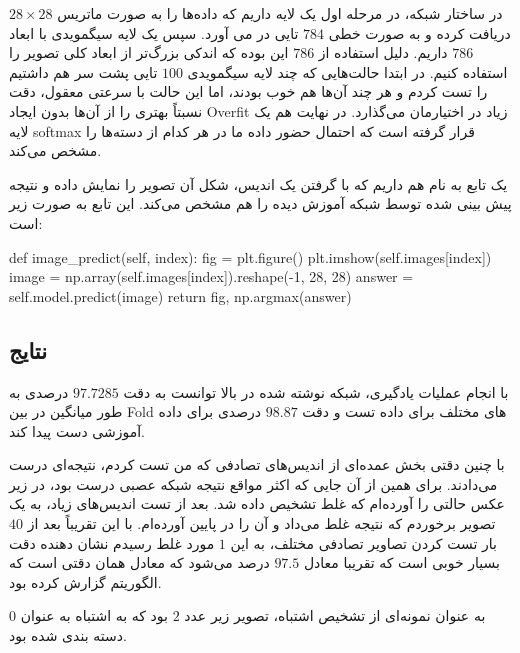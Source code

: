 \documentclass[12pt,titlepage,a4page , tikz , multi,table , svgnames,xcdraw]{article}
\begin{document}
در ساختار شبکه، در مرحله اول یک لایه داریم که داده‌ها را به صورت ماتریس $28 \times 28$ دریافت کرده و به صورت خطی $784$ تایی در می آورد. سپس یک لایه سیگمویدی با ابعاد $786$ داریم. دلیل استفاده از $786$ این بوده که اندکی بزرگ‌تر از ابعاد کلی تصویر را استفاده کنیم. در ابتدا حالت‌هایی که چند لایه سیگمویدی $100$ تایی پشت سر هم داشتیم را تست کردم و هر چند آن‌ها هم خوب بودند، اما این حالت با سرعتی معقول، دقت نسبتاً بهتری را از آن‌ها بدون ایجاد Overfit زیاد در اختیارمان می‌گذارد. در نهایت هم یک لایه softmax قرار گرفته است که احتمال حضور داده ما در هر کدام از دسته‌ها را مشخص می‌کند.


یک تابع به نام  هم داریم که با گرفتن یک اندیس، شکل آن تصویر را نمایش داده و نتیجه پیش بینی شده توسط شبکه آموزش دیده را هم مشخص می‌کند. این تابع به صورت زیر است:

\begin{latin}
\begin{python}[language=Python]
    def image_predict(self, index):
        fig = plt.figure()
        plt.imshow(self.images[index])
        image = np.array(self.images[index]).reshape(-1, 28, 28)
        answer = self.model.predict(image)
        return fig, np.argmax(answer)
\end{python}

\end{latin}


\newpage
\subsection{نتایج}
با انجام عملیات یادگیری، شبکه نوشته شده در بالا توانست به دقت $97.7285$ درصدی به طور میانگین در بین Fold های مختلف برای داده تست و دقت $98.87$ درصدی برای داده آموزشی دست پیدا کند.

با چنین دقتی بخش عمده‌ای از اندیس‌های تصادفی که من تست کردم، نتیجه‌ای درست می‌دادند. برای همین از آن جایی که اکثر مواقع نتیجه شبکه عصبی درست بود، در زیر عکس حالتی را آورده‌ام که غلط تشخیص داده شد. بعد از تست اندیس‌های زیاد، به یک تصویر برخوردم که نتیجه غلط می‌داد و آن را در پایین آورده‌ام. با این تقریباً بعد از $40$ بار تست کردن تصاویر تصادفی مختلف، به این $1$ مورد غلط رسیدم نشان دهنده دقت بسیار خوبی است که تقریبا معادل $97.5$ درصد می‌شود که معادل همان دقتی است که الگوریتم گزارش کرده بود.


به عنوان نمونه‌ای از تشخیص اشتباه، تصویر زیر عدد $2$ بود که به اشتباه به عنوان $0$ دسته بندی شده بود.
\end{document}
